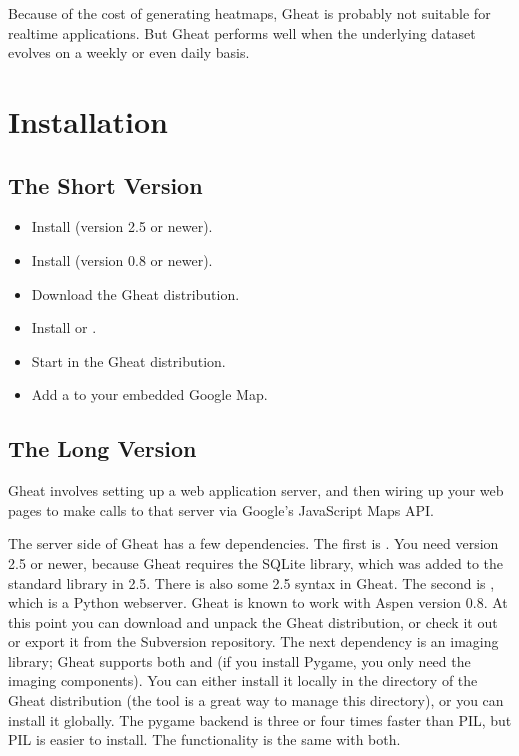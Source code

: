 \documentclass{manual}
\begin{document}
Because of the cost of generating heatmaps, Gheat is probably not suitable for
realtime applications. But Gheat performs well when the underlying dataset
evolves on a weekly or even daily basis.


\chapter{Installation}
\label{installation}

\section{The Short Version}

\begin{itemize}
\item{Install  (version 2.5 or newer).}
\item{Install  (version 0.8 or newer).}
\item{Download the Gheat distribution.}
\item{Install  or .}
\item{Start  in the Gheat distribution.}
\item{Add a  to your embedded Google Map.}
\end{itemize}


\section{The Long Version}

Gheat involves setting up a web application server, and then wiring up your
web pages to make calls to that server via Google's JavaScript Maps API.

The server side of Gheat has a few dependencies. The first is
. You need version 2.5 or newer, because
Gheat requires the SQLite library, which was added to the standard library in
2.5. There is also some 2.5 syntax in Gheat.  The second is
, which is a Python
webserver. Gheat is known to work with Aspen version 0.8. At this point you can
download and unpack the Gheat distribution, or check it out or export it from
the Subversion repository. The next dependency is an imaging library; Gheat
supports both  and
 (if you install Pygame,
you only need the imaging components). You can either install it locally in the
\file{__} directory of the Gheat distribution (the
 tool is a great way
to manage this directory), or you can install it globally. The pygame backend
is three or four times faster than PIL, but PIL is easier to install.  The
functionality is the same with both.
\end{document}
